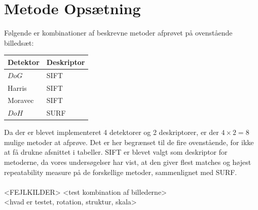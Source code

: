 \section{Metode Opsætning}
Følgende er kombinationer af beskrevne metoder afprøvet på ovenstående billedsæt:
\begin{center}
    \begin{tabular}{ | l | l |}
    \hline
    Detektor & Deskriptor \\ \hline
    $DoG$ & SIFT \\ \hline       
    Harris & SIFT \\ \hline    
    Moravec & SIFT \\ \hline    
    $DoH$ & SURF\\ \hline    
    \end{tabular}
\end{center}
Da der er blevet implementeret 4 detektorer og 2 deskriptorer, er der $4\times 2=8$ mulige metoder at afprøve. Det er her begrænset til de fire ovenstående, for ikke at få drukne afsnittet i tabeller. SIFT er blevet valgt som deskriptor for metoderne, da vores undersøgelser har vist, at den giver flest matches og højest repeatability measure på de forskellige metoder, sammenlignet med SURF. 
\\
\\


<FEJLKILDER>
<test kombination af billederne> \\
<hvad er testet, rotation, struktur, skala>